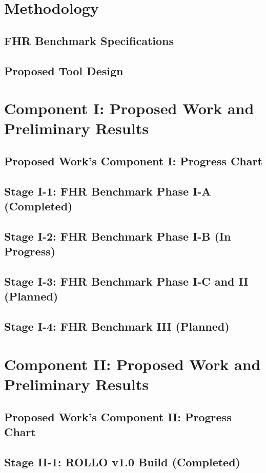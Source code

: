 \documentclass[9pt]{beamer}
\begin{document}
\section{Methodology}
\subsection{FHR Benchmark Specifications}

\subsection{Proposed Tool Design}


\section{Component I: Proposed Work and Preliminary Results}
\subsection{Proposed Work's Component I: Progress Chart}

\subsection{Stage I-1: FHR Benchmark Phase I-A (Completed)}

\subsection{Stage I-2: FHR Benchmark Phase I-B (In Progress)}

\subsection{Stage I-3: FHR Benchmark Phase I-C and II (Planned)}

\subsection{Stage I-4: FHR Benchmark III (Planned)}


\section{Component II: Proposed Work and Preliminary Results}
\subsection{Proposed Work's Component II: Progress Chart}

\subsection{Stage II-1: ROLLO v1.0 Build (Completed)}

\end{document}
